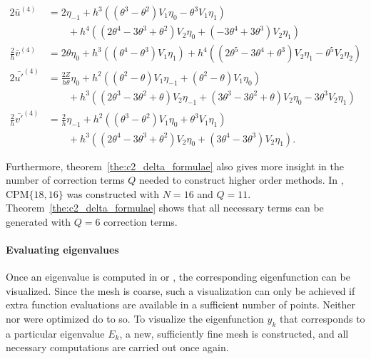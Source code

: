 \begin{align*}
    2\bar{u}^{(4)}            & = 2 \eta_{-1} + h^{3}\left(\left(\theta^{3} - \theta^{2}\right) V_{1} \eta_{0} -\theta^{3} V_{1} \eta_{1}\right)                                                                                                 \\
                              & \quad\quad + h^{4}\left(\left(2 \theta^{4} - 3 \theta^{3} + \theta^{2}\right) V_{2} \eta_{0} + \left(-3 \theta^{4} + 3 \theta^{3}\right) V_{2} \eta_{1}\right)                                                   \\
    \frac{2}{h}\bar{v}^{(4)}  & = 2 \theta \eta_{0} + h^{3}\left(\left(\theta^{4} - \theta^{3}\right) V_{1} \eta_{1}\right) + h^{4}\left(\left(2 \theta^{5} - 3 \theta^{4} + \theta^{3}\right) V_{2} \eta_{1} - \theta^{5} V_{2} \eta_{2}\right) \\
    2\bar{u'}^{(4)}           & = \frac{2Z}{h\theta} \eta_0 + h^{2}\left(\left(\theta^{2} - \theta\right) V_{1} \eta_{-1} + \left(\theta^{2} - \theta\right) V_{1} \eta_{0}\right)                                                               \\
                              & \quad\quad+ h^{3}\left(\left(2 \theta^{3} - 3 \theta^{2} + \theta\right) V_{2} \eta_{-1} + \left(3 \theta^{3} - 3 \theta^{2} + \theta\right) V_{2} \eta_{0} - 3 \theta^{3} V_{2} \eta_{1}\right)                 \\
    \frac{2}{h}\bar{v'}^{(4)} & = \frac{2}{h} \eta_{-1} + h^{2}\left(\left(\theta^{3} - \theta^{2}\right) V_{1} \eta_{0} + \theta^{3} V_{1} \eta_{1}\right)                                                                                      \\
                              & \quad\quad + h^{3}\left(\left(2 \theta^{4} - 3 \theta^{3} + \theta^{2}\right) V_{2} \eta_{0} + \left(3 \theta^{4} - 3 \theta^{3}\right) V_{2} \eta_{1}\right) \text{.}
\end{align*}%
\endgroup

Furthermore, theorem~\ref{the:c2_delta_formulae} also gives more insight in the number of correction terms $Q$ needed to construct higher order methods. In , $\text{CPM}\{18, 16\}$ was constructed with $N=16$ and $Q=11$. Theorem~\ref{the:c2_delta_formulae} shows that all necessary terms can be generated with $Q=6$ correction terms.


\paragraph{Evaluating eigenvalues}
Once an eigenvalue is computed in \matslise{} or , the corresponding eigenfunction can be visualized. Since the mesh is coarse, such a visualization can only be achieved if extra function evaluations are available in a sufficient number of points. Neither \matslise{} nor  were optimized do to so. To visualize the eigenfunction $y_k$ that corresponds to a particular eigenvalue $E_k$, a new, sufficiently fine mesh is constructed, and all necessary computations are carried out once again.

